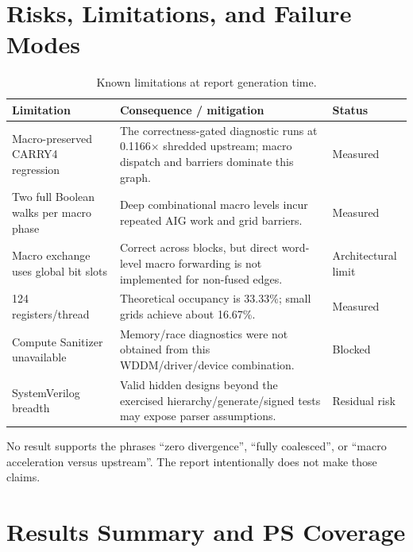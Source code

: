 \documentclass[11pt,a4paper]{article}
\begin{document}
\section{Risks, Limitations, and Failure Modes}

\begin{table}[H]
\centering
\caption{Known limitations at report generation time.}
\begin{tabularx}{\textwidth}{P{42mm} Y C{22mm}}
\toprule
Limitation & Consequence / mitigation & Status \\
\midrule
Macro-preserved CARRY4 regression & The correctness-gated diagnostic runs at 0.1166$\times$ shredded upstream; macro dispatch and barriers dominate this graph. & Measured \\
Two full Boolean walks per macro phase & Deep combinational macro levels incur repeated AIG work and grid barriers. & Measured \\
Macro exchange uses global bit slots & Correct across blocks, but direct word-level macro forwarding is not implemented for non-fused edges. & Architectural limit \\
124 registers/thread & Theoretical occupancy is 33.33\%; small grids achieve about 16.67\%. & Measured \\
Compute Sanitizer unavailable & Memory/race diagnostics were not obtained from this WDDM/driver/device combination. & Blocked \\
SystemVerilog breadth & Valid hidden designs beyond the exercised hierarchy/generate/signed tests may expose parser assumptions. & Residual risk \\
\bottomrule
\end{tabularx}
\end{table}

No result supports the phrases ``zero divergence'', ``fully coalesced'', or
``macro acceleration versus upstream''.  The report intentionally does not make
those claims.

\section{Results Summary and PS Coverage}
\end{document}
